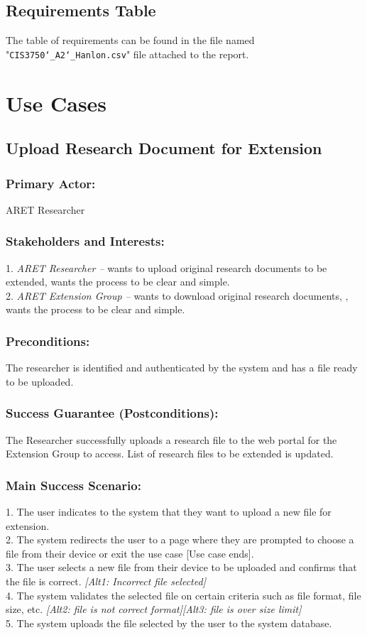 \documentclass[12pt,letterpaper]{article}
\begin{document}
\subsection{Requirements Table}
The table of requirements can be found in the file named "\texttt{CIS3750\char`_A2\char`_Hanlon.csv}" file attached to the report.

\clearpage
\section{Use Cases}

\subsection{Upload Research Document for Extension}
\subsubsection*{Primary Actor:} ARET Researcher
\subsubsection*{Stakeholders and Interests:}
1. \emph{ARET Researcher --} wants to upload original research documents to be extended, wants the process to be clear and simple.\\[10pt]
2. \emph{ARET Extension Group --} wants to download original research documents, , wants the process to be clear and simple.

\subsubsection*{Preconditions:}
The researcher is identified and authenticated by the system and has a file ready to be uploaded.

\subsubsection*{Success Guarantee (Postconditions):}
The Researcher successfully uploads a research file to the web portal for the Extension Group to access. List of research files to be extended is updated.

\subsubsection*{Main Success Scenario:}
1. The user indicates to the system that they want to upload a new file for extension.\\
2. The system redirects the user to a page where they are prompted to choose a file from their device or exit the use case [Use case ends].\\
3. The user selects a new file from their device to be uploaded and confirms that the file is correct. \emph{[Alt1: Incorrect file selected]}\\
4. The system validates the selected file on certain criteria such as file format, file size, etc. \emph{[Alt2: file is not correct format][Alt3: file is over size limit]}\\
5. The system uploads the file selected by the user to the system database. 
\end{document}
